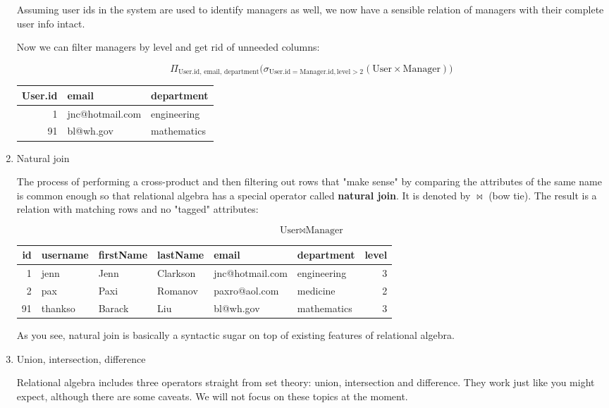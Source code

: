 \documentclass[12pt, a4paper, justified, notitlepage, sfsidenotes, notoc]{book}
\begin{document}
\begin{enumerate}
Assuming user ids in the system are used to identify managers as well, we now have a sensible relation of managers with their complete user info intact.

Now we can filter managers by level and get rid of unneeded columns:


\begin{equation}
\Pi_{\textrm{User.id, email, department}}
\big(
\sigma_{\textrm{User.id} = \textrm{Manager.id}, \textrm{level} > 2} (\textrm{User} \times \textrm{Manager})
\big)
\end{equation}

\begin{center}
\begin{tabular}{rll}
User.id & email & department\\
\hline
1 & jnc@hotmail.com & engineering\\
91 & bl@wh.gov & mathematics\\
\end{tabular}
\end{center}

\item Natural join
\label{sec:orge575251}

The process of performing a cross-product and then filtering out rows that "make sense" by comparing the attributes of the same name is common enough so that relational algebra has a special operator called \textbf{natural join}. It is denoted by \(\bowtie\) (bow tie). The result is a relation with matching rows and no "tagged" attributes:

\begin{equation}
\textrm{User} \bowtie \textrm{Manager}
\end{equation}

\begin{center}
\begin{tabular}{rlllllr}
id & username & firstName & lastName & email & department & level\\
\hline
1 & jenn & Jenn & Clarkson & jnc@hotmail.com & engineering & 3\\
2 & pax & Paxi & Romanov & paxro@aol.com & medicine & 2\\
91 & thankso & Barack & Liu & bl@wh.gov & mathematics & 3\\
\end{tabular}
\end{center}

As you see, natural join is basically a syntactic sugar on top of existing features of relational algebra.

\item Union, intersection, difference
\label{sec:org0f63a39}

Relational algebra includes three operators straight from set theory: union, intersection and difference. They work just like you might expect, although there are some caveats. We will not focus on these topics at the moment.
\end{enumerate}
\end{document}
